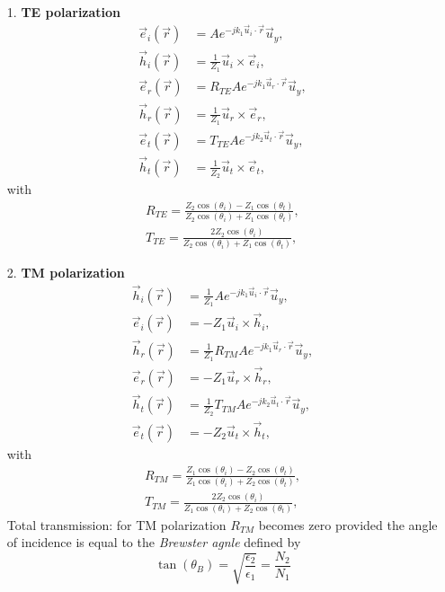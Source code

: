 \documentclass[a4paper, 10pt]{article}
\begin{document}
    \begin{itemize}
        \item[1.] \textbf{TE polarization}
            \begin{align}
                \vec{e}_i(\vec{r}) &= Ae^{-jk_1\vec{u}_i\cdot\vec{r}}\vec{u}_y, \nonumber\\
                \vec{h}_i(\vec{r}) &= \frac{1}{Z_1}\vec{u}_i\times\vec{e}_i, \nonumber\\
                \vec{e}_r(\vec{r}) &= R_{TE}Ae^{-jk_1\vec{u}_r\cdot\vec{r}}\vec{u}_y, \label{H5eq24}\\
                \vec{h}_r(\vec{r}) &= \frac{1}{Z_1}\vec{u}_r\times\vec{e}_r, \nonumber\\
                \vec{e}_t(\vec{r}) &= T_{TE}Ae^{-jk_2\vec{u}_t\cdot\vec{r}}\vec{u}_y, \nonumber\\
                \vec{h}_t(\vec{r}) &= \frac{1}{Z_2}\vec{u}_t\times\vec{e}_t, \nonumber
            \end{align}
            with
            \begin{align}
                R_{TE} = \frac{Z_2\cos(\theta_i)-Z_1\cos(\theta_t)}{Z_2\cos(\theta_i)+Z_1\cos(\theta_t)}, \label{H5eq25}\\
                T_{TE} = \frac{2Z_2\cos(\theta_i)}{Z_2\cos(\theta_i)+Z_1\cos(\theta_t)}, \label{H5eq26}
            \end{align}
        \item[2.] \textbf{TM polarization}
        \begin{align}
            \vec{h}_i(\vec{r}) &= \frac{1}{Z_1}Ae^{-jk_1\vec{u}_i\cdot\vec{r}}\vec{u}_y, \nonumber\\
            \vec{e}_i(\vec{r}) &= -Z_1\vec{u}_i\times\vec{h}_i, \nonumber\\
            \vec{h}_r(\vec{r}) &= \frac{1}{Z_1}R_{TM}Ae^{-jk_1\vec{u}_r\cdot\vec{r}}\vec{u}_y, \label{H5eq27}\\
            \vec{e}_r(\vec{r}) &= -Z_1\vec{u}_r\times\vec{h}_r, \nonumber\\
            \vec{h}_t(\vec{r}) &= \frac{1}{Z_2}T_{TM}Ae^{-jk_2\vec{u}_t\cdot\vec{r}}\vec{u}_y, \nonumber\\
            \vec{e}_t(\vec{r}) &= -Z_2\vec{u}_t\times\vec{h}_t, \nonumber
        \end{align}
        with
        \begin{align}
            R_{TM} = \frac{Z_1\cos(\theta_i)-Z_2\cos(\theta_t)}{Z_1\cos(\theta_i)+Z_2\cos(\theta_t)}, \label{H5eq28}\\
            T_{TM} = \frac{2Z_2\cos(\theta_i)}{Z_1\cos(\theta_i)+Z_2\cos(\theta_t)}, \label{H5eq29}
        \end{align}
        Total transmission: for TM polarization $R_{TM}$ becomes zero provided the angle of incidence is equal to the \textit{Brewster agnle} defined by
        \begin{equation}
            \tan(\theta_B) = \sqrt{\frac{\epsilon_2}{\epsilon_1}} = \frac{N_2}{N_1} \label{H5eq30}
        \end{equation}
    \end{itemize}


 
\end{document}
